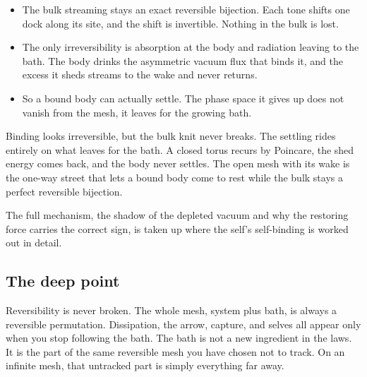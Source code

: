 \begin{itemize}
\item The bulk streaming stays an exact reversible bijection. Each tone shifts one dock along its site, and the shift is invertible. Nothing in the bulk is lost.
\item The only irreversibility is absorption at the body and radiation leaving to the bath. The body drinks the asymmetric vacuum flux that binds it, and the excess it sheds streams to the wake and never returns.
\item So a bound body can actually settle. The phase space it gives up does not vanish from the mesh, it leaves for the growing bath.
\end{itemize}

\begin{result}
Binding looks irreversible, but the bulk knit never breaks. The settling rides entirely on what leaves for the bath. A closed torus recurs by Poincare, the shed energy comes back, and the body never settles. The open mesh with its wake is the one-way street that lets a bound body come to rest while the bulk stays a perfect reversible bijection.
\end{result}

The full mechanism, the shadow of the depleted vacuum and why the restoring force carries the correct sign, is taken up where the self's self-binding is worked out in detail.

\subsection{The deep point}

Reversibility is never broken. The whole mesh, system plus bath, is always a reversible permutation. Dissipation, the arrow, capture, and selves all appear only when you stop following the bath. The bath is not a new ingredient in the laws. It is the part of the same reversible mesh you have chosen not to track. On an infinite mesh, that untracked part is simply everything far away.
